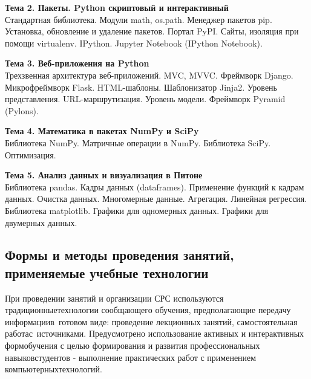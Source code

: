 \documentclass[a4paper,12pt]{article}
\begin{document}
\textbf{Тема 2. Пакеты. Python скриптовый и интерактивный  }\\
Стандартная библиотека. Модули math, os.path. Менеджер пакетов pip.
Установка, обновление и удаление пакетов. Портал PyPI. Сайты,
изоляция при помощи virtualenv. IPython. Jupyter Notebook (IPython
Notebook).


\textbf{Тема 3. Веб-приложения на Python                   }\\
Трехзвенная архитектура веб-приложений. MVC, MVVC. Фреймворк Django.
Микрофреймворк Flask. HTML-шаблоны. Шаблонизатор Jinja2.
Уровень представления. URL-маршрутизация. Уровень модели. Фреймворк
Pyramid (Pylons).


\textbf{Тема 4. Математика в пакетах NumPy и SciPy         }\\
Библиотека NumPy. Матричные операции в NumPy. Библиотека SciPy.
Оптимизация.


\textbf{Тема 5. Анализ данных и визуализация в Питоне      }\\
Библиотека pandas. Кадры данных  (dataframes). Применение функций к
кадрам данных. Очистка данных. Многомерные данные. Агрегация.
Линейная регрессия.  Библиотека matplotlib. Графики для одномерных
данных. Графики для двумерных данных.

 

\subsection{Формы и методы проведения занятий, применяемые учебные технологии}
При проведении занятий и организации СРС используются традиционныетехнологии сообщающего обучения, предполагающие передачу информациив~готовом виде: проведение лекционных занятий, самостоятельная работас~источниками. Предусмотрено использование активных и интерактивных формобучения с целью формирования и развития профессиональных навыковстудентов - выполнение практических работ с применением компьютерныхтехнологий.
\end{document}
